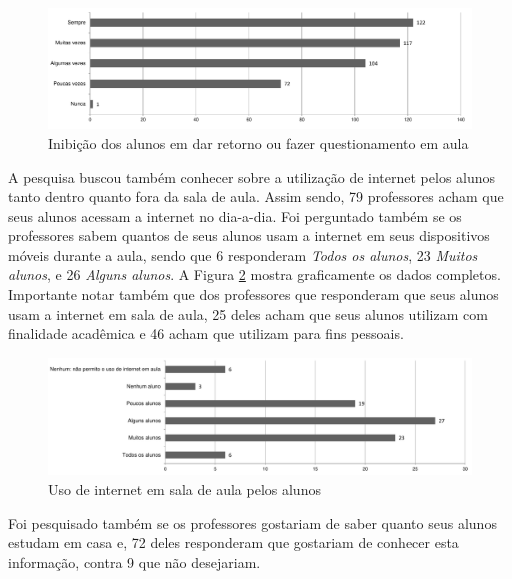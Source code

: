 \begin{figure}[!h]
\centering
\includegraphics[width=1.0\textwidth]{pdfs/alunos-professores/pesquisa-inibicao-alunos.pdf} 
\caption{Inibição dos alunos em dar retorno ou fazer questionamento em aula }
\label{fig:grafico_inibicao} 
\end{figure}



A pesquisa buscou também conhecer sobre a utilização de internet pelos alunos tanto dentro quanto fora da sala de aula. Assim sendo, 79 professores acham que seus alunos acessam a internet no dia-a-dia. Foi perguntado também se os professores sabem quantos de seus alunos usam a internet em seus dispositivos móveis durante a aula, sendo que 6 responderam \emph{Todos os alunos}, 23 \emph{Muitos alunos}, e 26 \emph{Alguns alunos}. A Figura \ref{fig:grafico_internet_sala} mostra graficamente os dados completos. Importante notar também que dos professores que responderam que seus alunos usam a internet em sala de aula, 25 deles acham que seus alunos utilizam com finalidade acadêmica e 46 acham que utilizam para fins pessoais.

\begin{figure}[!h]
\centering
\includegraphics[width=1.0\textwidth]{pdfs/alunos-professores/pesquisa-uso-internet-sala.pdf} 
\caption{Uso de internet em sala de aula pelos alunos}
\label{fig:grafico_internet_sala} 
\end{figure}

Foi pesquisado também se os professores gostariam de saber quanto seus alunos estudam em casa e, 72 deles responderam que gostariam de conhecer esta informação, contra 9 que não desejariam.

